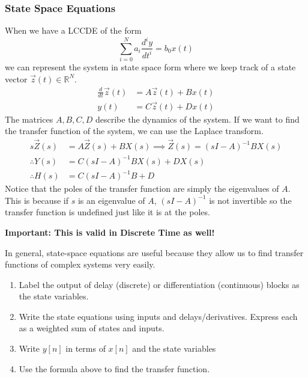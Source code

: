 \subsubsection{State Space Equations}
When we have a LCCDE of the form
\[
\sum_{i=0}^{N}{a_i\frac{d^iy}{dt^i}} = b_0x(t)
\]
we can represent the system in state space form where we keep track of a state vector $\vec{z}(t)\in\mathbb{R}^N$.
\begin{align*}
    \frac{d}{dt}\vec{z}(t) &= A\vec{z}(t)+Bx(t)\\
    y(t) &= C\vec{z}(t)+Dx(t)
\end{align*}
The matrices $A,B,C,D$ describe the dynamics of the system.
If we want to find the transfer function of the system, we can use the Laplace transform.
\begin{align*}
    s\vec{Z}(s) &= A\vec{Z}(s)+BX(s) \implies \vec{Z}(s) = (sI-A)^{-1}BX(s)\\
    \therefore Y(s) &= C(sI-A)^{-1}BX(s)+DX(s)\\
    \therefore H(s) &= C(sI-A)^{-1}B+D
\end{align*}
Notice that the poles of the transfer function are simply the eigenvalues of $A$. This is because
if $s$ is an eigenvalue of $A$, $(sI-A)^{-1}$ is not invertible so the transfer function is undefined
just like it is at the poles.

\textbf{Important: This is valid in Discrete Time as well!}

In general, state-space equations are useful because they allow us to find transfer functions of complex systems very easily.
\begin{enumerate}[Step 1:]
    \item Label the output of delay (discrete) or differentiation (continuous) blocks as the state variables.
    \item Write the state equations using inputs and delays/derivatives. Express each as a weighted sum of states and inputs.
    \item Write $y[n]$ in terms of $x[n]$ and the state variables
    \item Use the formula above to find the transfer function.  
\end{enumerate}
